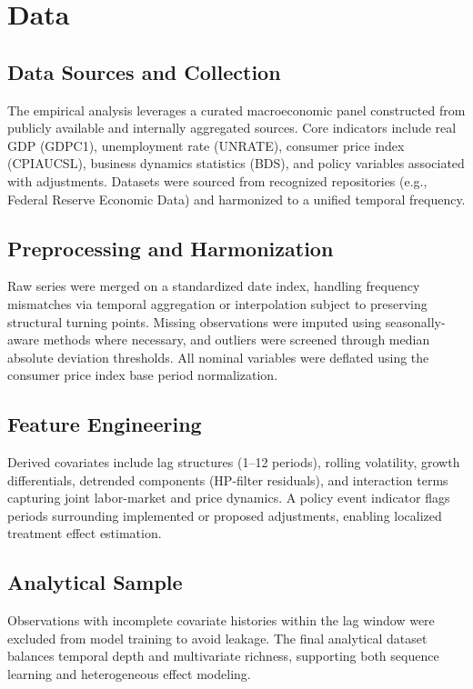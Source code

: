 \section{Data}\label{sec:data}
\subsection{Data Sources and Collection}
The empirical analysis leverages a curated macroeconomic panel constructed from publicly available and internally aggregated sources. Core indicators include real GDP (GDPC1), unemployment rate (UNRATE), consumer price index (CPIAUCSL), business dynamics statistics (BDS), and policy variables associated with \VAT{} adjustments. Datasets were sourced from recognized repositories (e.g., Federal Reserve Economic Data) and harmonized to a unified temporal frequency.

\subsection{Preprocessing and Harmonization}
Raw series were merged on a standardized date index, handling frequency mismatches via temporal aggregation or interpolation subject to preserving structural turning points. Missing observations were imputed using seasonally-aware methods where necessary, and outliers were screened through median absolute deviation thresholds. All nominal variables were deflated using the consumer price index base period normalization.

\subsection{Feature Engineering}
Derived covariates include lag structures (1--12 periods), rolling volatility, growth differentials, detrended components (HP-filter residuals), and interaction terms capturing joint labor-market and price dynamics. A policy event indicator flags periods surrounding implemented or proposed \VAT{} adjustments, enabling localized treatment effect estimation.

\subsection{Analytical Sample}
Observations with incomplete covariate histories within the lag window were excluded from model training to avoid leakage. The final analytical dataset balances temporal depth and multivariate richness, supporting both sequence learning and heterogeneous effect modeling.

